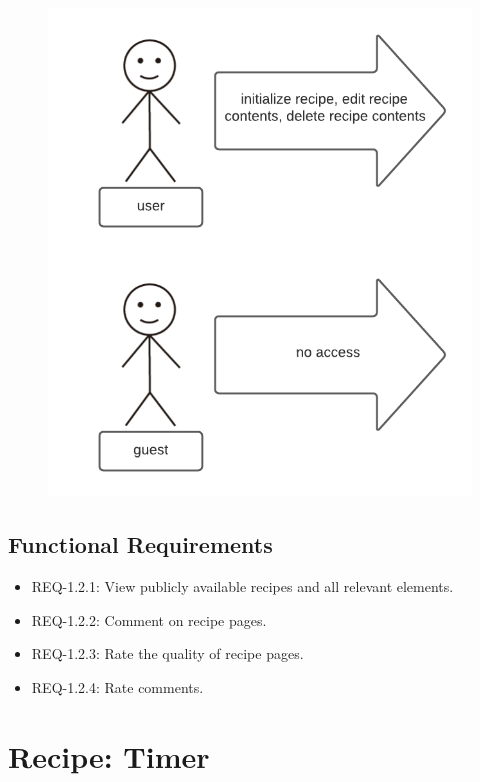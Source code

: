 \documentclass{scrreprt}
\begin{document}
\begin{figure}[H]\centering
    \includegraphics[width=\columnwidth]{response diagrams/Recipe Pages.png}
\end{figure}

\subsection{\gls{Functional Requirements}}

\begin{itemize}
    \item REQ-1.2.1: View publicly available recipes and all relevant elements.
    \item REQ-1.2.2: Comment on recipe pages.
    \item REQ-1.2.3: Rate the quality of recipe pages.
    \item REQ-1.2.4: Rate comments.
\end{itemize}

\section{Recipe: Timer}
\end{document}
